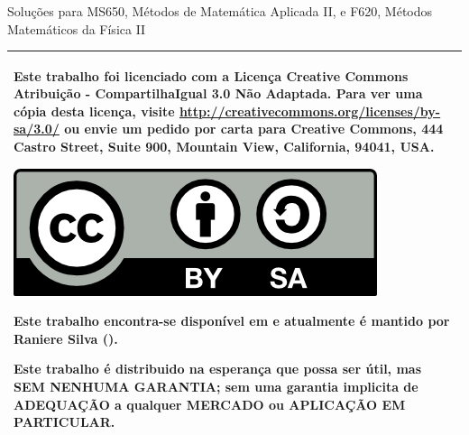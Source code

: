 % 
% 
% 
% 
% 
% 
%
%
\begin{center}
    \LARGE{Solu\c{c}\~{o}es para MS650, M\'{e}todos de Matem\'{a}tica Aplicada II, e F620, M\'{e}todos Matem\'{a}ticos da F\'{i}sica II}
    
    \Large{\mycheader}
\end{center}
\vspace{.5\textheight}

\begin{tabular}{|p{}|}
\hline
Este trabalho foi licenciado com a Licen\c{c}a Creative Commons Atribui\c{c}\~{a}o - CompartilhaIgual 3.0 N\~{a}o Adaptada. Para ver uma c\'{o}pia desta licen\c{c}a, visite \url{http://creativecommons.org/licenses/by-sa/3.0/} ou envie um pedido por carta para Creative Commons, 444 Castro Street, Suite 900, Mountain View, California, 94041, USA.
\begin{center}
\includegraphics[scale=1]{cc-by-sa.png}
\end{center}
Este trabalho encontra-se dispon\'{i}vel em  e atualmente \'{e} mantido por Raniere Silva ().

Este trabalho \'{e} distribuido na esperança que possa ser \'{u}til, mas SEM NENHUMA GARANTIA; sem uma garantia implicita de ADEQUA\c{C}\~{A}O a qualquer MERCADO ou APLICA\c{C}\~{A}O EM PARTICULAR.
\\ \hline
\end{tabular}

